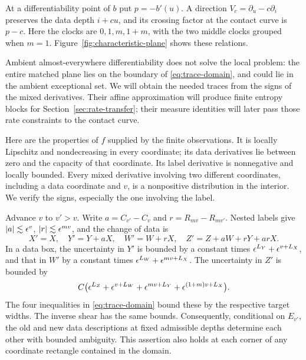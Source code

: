At a differentiability point of $b$ put $p=-b'(u)$.  A direction
$V_c=\partial_u-c\partial_i$ preserves the data depth $i+cu$, and
its crossing factor at the contact curve is $p-c$.  Here the clocks
are $0,1,m,1+m$, with the two middle clocks grouped when $m=1$.
Figure~\ref{fig:characteristic-plane} shows these relations.


Ambient almost-everywhere differentiability does not solve the local
problem: the entire matched plane lies on the boundary of
\eqref{eq:trace-domain}, and could lie in the ambient exceptional set.
We will obtain the needed traces from the signs of the mixed
derivatives.  Their affine approximation will produce finite entropy
blocks for Section~\ref{sec:rate-transfer}; their measure identities
will later pass those rate constraints to the contact curve.

Here are the properties of $f$ supplied by the finite observations.
It is locally Lipschitz and nondecreasing in every coordinate; its data
derivatives lie between zero and the capacity of that coordinate.  Its
label derivative is nonnegative and locally bounded.  Every mixed
derivative involving two different coordinates, including a data
coordinate and $v$, is a nonpositive distribution in the interior.
We verify the signs, especially the one involving the label.

Advance $v$ to $v'>v$.  Write $a=C_{v'}-C_v$ and
$r=R_{mv}-R_{mv'}$.  Nested labels give
$|a|\lesssim\epsilon^v$, $|r|\lesssim\epsilon^{mv}$, and the change of data is
\begin{equation}\label{eq:trace-frame-change}
 X'=X,\quad Y'=Y+aX,\quad W'=W+rX,\quad
 Z'=Z+aW+rY+arX.
\end{equation}
In a data box, the uncertainty in $Y'$ is bounded by a constant times
$\epsilon^{L_Y}+\epsilon^{v+L_X}$, and that in $W'$ by a constant times
$\epsilon^{L_W}+\epsilon^{mv+L_X}$.  The uncertainty in $Z'$ is bounded by
\[
 C\bigl(\epsilon^{L_Z}+\epsilon^{v+L_W}
       +\epsilon^{mv+L_Y}+\epsilon^{(1+m)v+L_X}\bigr).
\]
The four inequalities in \eqref{eq:trace-domain} bound these by the
respective target widths.  The inverse shear has the same bounds.
Consequently, conditional on $E_{v'}$, the old and new data descriptions
at fixed admissible depths determine each other with bounded ambiguity.
This assertion also holds at each corner of any coordinate rectangle
contained in the domain.

